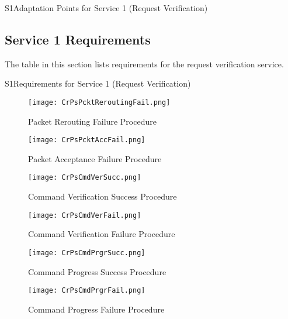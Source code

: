 \documentclass{pnp_article}
\begin{document}
\begin{cr_ap}{S1}{Adaptation Points for Service 1 (Request Verification)}
\end{cr_ap}


\subsection{Service 1 Requirements}
The table in this section lists requirements for the request verification service.

\begin{cr_req}{S1}{Requirements for Service 1 (Request Verification)}
\end{cr_req}


\newpage
\begin{figure}[H]
 \centering
 \texttt{[image: CrPsPcktReroutingFail.png]}
 \caption{Packet Rerouting Failure Procedure}
 \label{fig:PcktReroutingFail}
\end{figure}

\begin{figure}[htbp]
 \centering
 \texttt{[image: CrPsPcktAccFail.png]}
 \caption{Packet Acceptance Failure Procedure}
 \label{fig:PcktAccFail}
\end{figure}

\begin{figure}[htbp]
 \centering
 \texttt{[image: CrPsCmdVerSucc.png]}
 \caption{Command Verification Success Procedure}
 \label{fig:CmdVerSucc}
\end{figure}

\begin{figure}[htbp]
 \centering
 \texttt{[image: CrPsCmdVerFail.png]}
 \caption{Command Verification Failure Procedure}
 \label{fig:CmdVerFail}
\end{figure}

\begin{figure}[htbp]
 \centering
 \texttt{[image: CrPsCmdPrgrSucc.png]}
 \caption{Command Progress Success Procedure}
 \label{fig:CmdPrgrSucc}
\end{figure}

\begin{figure}[H]
 \centering
 \texttt{[image: CrPsCmdPrgrFail.png]}
 \caption{Command Progress Failure Procedure}
 \label{fig:CmdPrgrFail}
\end{figure}
\end{document}
